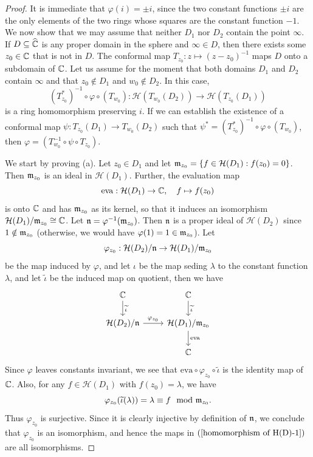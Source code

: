 \begin{proof}
It is immediate that $\varphi(i)=\pm i$, since the two constant functions $\pm i$ are the only elements of the two rings whose squares are the constant function $-1$. We now show that we may assume that neither $D_1$ nor $D_2$ contain the point $\infty$. If $D\subseteq\widehat{\mathbb{C}}$ is any proper domain in the sphere and $\infty\in D$, then there exists some $z_0\in\mathbb{C}$ that is not in $D$. The conformal map $T_{z_0}:z\mapsto(z-z_0)^{-1}$ maps $D$ onto a subdomain of $\mathbb{C}$. Let us assume for the moment that both domains $D_1$ and $D_2$ contain $\infty$ and that $z_0\notin D_1$ and $w_0\notin D_2$. In this case,
\[(T^*_{z_0})^{-1}\circ\varphi\circ(T_{w_0}):\mathcal{H}(T_{w_0}(D_2))\to\mathcal{H}(T_{z_0}(D_1))\]
is a ring homomorphism preserving $i$. If we can establish the existence of a conformal map $\psi:T_{z_0}(D_1)\to T_{w_0}(D_2)$ such that $\psi^*=(T^*_{z_0})^{-1}\circ\varphi\circ(T_{w_0})$, then $\varphi=(T_{w_0}^{-1}\circ\psi\circ T_{z_0})$.\par
We start by proving (a). Let $z_0\in D_1$ and let $\mathfrak{m}_{z_0}=\{f\in\mathcal{H}(D_1):f(z_0)=0\}$. Then $\mathfrak{m}_{z_0}$ is an ideal in $\mathcal{H}(D_1)$. Further, the evaluation map
\[\mathrm{eva}:\mathcal{H}(D_1)\to\mathbb{C},\quad f\mapsto f(z_0)\]
is onto $\mathbb{C}$ and has $\mathfrak{m}_{z_0}$ as its kernel, so that it induces an isomorphism $\mathcal{H}(D_1)/\mathfrak{m}_{z_0}\cong\mathbb{C}$. Let $\mathfrak{n}=\varphi^{-1}(\mathfrak{m}_{z_0})$. Then $\mathfrak{n}$ is a proper ideal of $\mathcal{H}(D_2)$ since $1\notin\mathfrak{m}_{z_0}$ (otherwise, we would have $\varphi(1)=1\in\mathfrak{m}_{z_0}$). Let
\[\varphi_{z_0}:\mathcal{H}(D_2)/\mathfrak{n}\to\mathcal{H}(D_1)/\mathfrak{m}_{z_0}\]
be the map induced by $\varphi$, and let $\iota$ be the map seding $\lambda$ to the constant function $\lambda$, and let $\widetilde{\iota}$ be the induced map on quotient, then we have
\begin{equation}\label{homomorphism of H(D)-1}
\begin{tikzcd}
\C\ar[d,"\widetilde{\iota}"]&\C\ar[d,"\widetilde{\iota}"]\\
\mathcal{H}(D_2)/\n\ar[r,"\varphi_{z_0}"]&\mathcal{H}(D_1)/\m_{z_0}\ar[d,"\mathrm{eva}"]\\
&\C
\end{tikzcd}
\end{equation}
Since $\varphi$ leaves constants invariant, we see that $\mathrm{eva}\circ\varphi_{z_0}\circ\widetilde{\iota}$ is the identity map of $\mathbb{C}$. Also, for any $f\in\mathcal{H}(D_1)$ with $f(z_0)=\lambda$, we have
\[\varphi_{z_0}(\widetilde{\iota}(\lambda))=\lambda\equiv f\mod{\mathfrak{m}}_{z_0}.\]
Thus $\varphi_{z_0}$ is surjective. Since it is clearly injective by definition of $\mathfrak{n}$, we conclude that $\varphi_{z_0}$ is an isomorphism, and hence the maps in $(\ref{homomorphism of H(D)-1})$ are all isomorphisms.\par

\end{proof}
